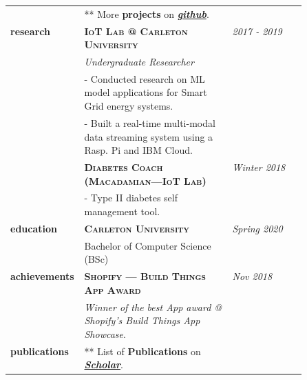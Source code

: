 \documentclass[9pt]{article}
\begin{document}
\begin{longtable}{@{}>{\raggedleft}p{0.25\linewidth}
                          p{}>{}p{0.25\linewidth}@{}}
            & ** More \textbf{projects} on \textit{\href{https://github.com/boshd}{\textbf{github}}}.\\ [1em]

                \textbf{research}
            & \textbf{\textsc{IoT Lab @ Carleton University}} & \textit{2017 - 2019} \\
            & \textit{Undergraduate Researcher} \\
            & - Conducted research on ML model applications for Smart Grid energy systems. \\
            & - Built a real-time multi-modal data streaming system using a Rasp. Pi and IBM Cloud. \\ [0.5em]

            & \textbf{\textsc{Diabetes Coach (Macadamian---IoT Lab)}} & \textit{Winter 2018} \\
            & - Type II diabetes self management tool. \\ [1em]

        \textbf{education}
            & \textbf{\textsc{Carleton University}} & \textit{Spring 2020} \\
            & Bachelor of Computer Science (BSc) \\ [1em]

        \textbf{achievements}
            & \textbf{\textsc{Shopify --- Build Things App Award}} & \textit{Nov 2018} \\
            & \textit{Winner of the best App award @ Shopify's Build Things App Showcase}. \\ [1em]

        \textbf{publications}
            & ** List of \textbf{Publications} on \textit{\href{https://scholar.google.ca/citations?user=zFDREhgAAAAJ\&hl=en}{\textbf{Scholar}}}.\\ [0.5em]


  \end{longtable}
\end{document}
